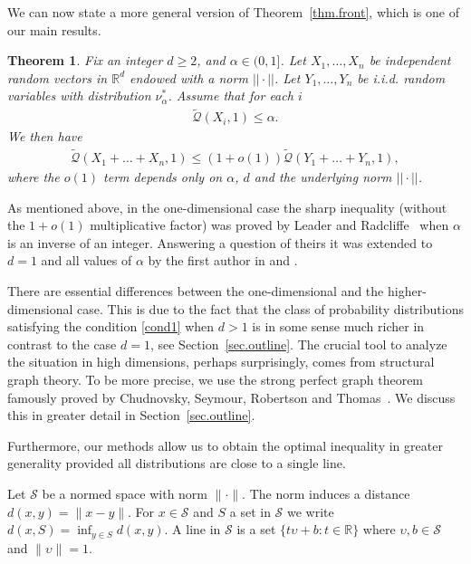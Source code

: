 \documentclass{article}
\newtheorem{theorem}{Theorem}[section]
\newcommand{\concdiam}{\tilde{\mathcal{Q}}}
\newcommand\nuopt[1]{\nu_{#1}^*}
\begin{document}
We can now state a more general version of Theorem~\ref{thm.front}, which is one of our main results.

\begin{theorem}\label{teor1}
    Fix an integer $d \ge 2$, and $\alpha \in (0,1]$.
    Let $X_1, \dots, X_n$ be independent random vectors in $\mathbb{R}^d$ endowed with a norm $||\cdot||$. Let $Y_1,\ldots, Y_n$ be i.i.d. random variables with distribution $\nuopt \alpha$. Assume that for each $i$
    \begin{align}\label{cond1}
    \concdiam(X_i, 1) \le \alpha.
    \end{align}
    We then have
    \begin{align}\label{eq.thm1}
        \concdiam(X_1 + \dots + X_n, 1) \le (1 + o(1)) \concdiam(Y_1 + \dots + Y_n, 1),
    \end{align}
    where the $o(1)$ term depends only on $\alpha$, $d$ and the underlying norm $||\cdot||$. 
\end{theorem}

As mentioned above, in the one-dimensional case the sharp inequality (without the $1+o(1)$ multiplicative factor) was proved by Leader and Radcliffe~\cite{LR} when $\alpha$ is an inverse of an integer. Answering a question of theirs it was extended to $d=1$ and all values of $\alpha$ by the first author in \cite{disertacija} and \cite{tj}.

There are essential differences between the one-dimensional and the higher-dimensional case. This is due to the fact that the class of probability distributions satisfying the condition \eqref{cond1} when $d>1$ is in some sense much richer in contrast to the case $d=1$, see Section~\ref{sec.outline}. 
The crucial tool to analyze the situation in high dimensions, perhaps surprisingly, comes from structural graph theory. To be more precise, we use the strong perfect graph theorem famously proved by Chudnovsky, Seymour, Robertson and Thomas~\cite{strong_perfect}. We discuss this in greater detail in Section~\ref{sec.outline}.

Furthermore, our methods allow us to obtain the optimal inequality in greater generality provided all distributions are close to a single line.

Let $\mathcal{S}$ be a normed space with norm $\|\cdot\|$. The norm induces a distance $d(x,y) = \|x-y\|$. For $x \in \mathcal{S}$ and $S$ a set in $\mathcal{S}$ we write $d(x, S) = \inf_{y \in S} d(x,y)$.  A line in $\mathcal{S}$ is a set $\{t \upsilon + b: t \in\mathbb{R}\}$ where $\upsilon,b \in \mathcal{S}$ and $\|\upsilon\|=1$. 
\end{document}
